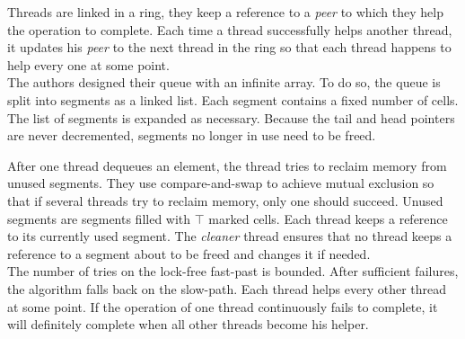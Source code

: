 Threads are linked in a ring, they keep a reference to a \textit{peer} to which
they help the operation to complete. Each time a thread successfully helps
another thread, it updates his \textit{peer} to the next thread in the ring so
that each
thread happens to help every one at some point. \\

 The authors designed their queue with an infinite
array. To do so, the queue is split into segments as a linked list. Each segment
contains a fixed number of cells. The list of segments is expanded as necessary.
Because the tail and head pointers are never decremented, segments no longer in
use need to be freed.

After one thread dequeues an element, the thread tries to reclaim memory from
unused segments. They use compare-and-swap to achieve mutual exclusion so that
if several threads try to reclaim memory, only one should succeed. Unused
segments are segments filled with $\top$ marked cells. Each thread keeps a
reference to its currently used segment. The \textit{cleaner} thread ensures
that no thread keeps a reference to a segment about to be freed and changes it
if needed. \\

 The number of tries on the lock-free fast-past is
bounded. After sufficient failures, the algorithm falls back on the slow-path.
Each thread helps every other thread at some point. If the operation of one
thread continuously fails to complete, it will definitely complete when all
other threads become his helper.
